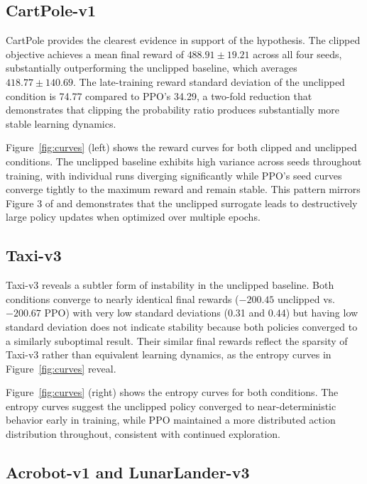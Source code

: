 \documentclass{article}
\begin{document}
\subsection{CartPole-v1}

CartPole provides the clearest evidence in support of the hypothesis. The clipped objective achieves a mean final reward of $488.91 \pm 19.21$ across all four seeds, substantially outperforming the unclipped baseline, which averages $418.77 \pm 140.69$. The late-training reward standard deviation of the unclipped condition is 74.77 compared to PPO's 34.29, a two-fold reduction that demonstrates that clipping the probability ratio produces substantially more stable learning dynamics.

Figure~\ref{fig:curves} (left) shows the reward curves for both clipped and unclipped conditions. The unclipped baseline exhibits high variance across seeds throughout training, with individual runs diverging significantly while PPO's seed curves converge tightly to the maximum reward and remain stable. This pattern mirrors Figure 3 of \citet{schulman2017ppo} and demonstrates that the unclipped surrogate leads to destructively large policy updates when optimized over multiple epochs.

\subsection{Taxi-v3}

Taxi-v3 reveals a subtler form of instability in the unclipped baseline. Both conditions converge to nearly identical final rewards ($-200.45$ unclipped vs.\ $-200.67$ PPO) with very low standard deviations (0.31 and 0.44) but having low standard deviation does not indicate stability because both policies converged to a similarly suboptimal result. Their similar final rewards reflect the sparsity of Taxi-v3 rather than equivalent learning dynamics, as the entropy curves in Figure~\ref{fig:curves} reveal.

Figure~\ref{fig:curves} (right) shows the entropy curves for both conditions. The entropy curves suggest the unclipped policy converged to near-deterministic behavior early in training, while PPO maintained a more distributed action distribution throughout, consistent with continued exploration.

\subsection{Acrobot-v1 and LunarLander-v3}
\end{document}
